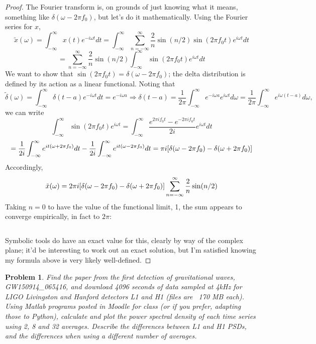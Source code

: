 \documentclass{article}
\newtheorem{plm}{Problem}
\begin{document}
\begin{proof}
  The Fourier transform is, on grounds of just knowing what it means, something like $\delta(\omega - 2\pi f_{0})$, but let's do it mathematically.
  Using the Fourier series for $x$,
  \[
    \tilde{x}(\omega) = \int_{-\infty}^{\infty}x(t)e^{-i\omega t}dt
    = \int_{-\infty}^{\infty}\sum_{n = -\infty}^{\infty}\frac{2}{n}\sin(n/2)\sin(2\pi f_{0} t)e^{i\omega t}dt
  \]
  \[
    = \sum_{n=-\infty}^{\infty}\frac{2}{n}\sin(n/2)\int_{-\infty}^{\infty}\sin(2\pi f_{0} t)e^{i \omega t}dt
  \]
  We want to show that $\sin(2\pi f_{0}t) = \delta(\omega - 2\pi f_{0})$; the delta distribution is defined by its action as a linear functional.
  Noting that
  \[
    \tilde{\delta}(\omega) = \int_{-\infty}^{\infty}\delta(t - a)e^{-i\omega t}dt = e^{-i\omega a}
    \Rightarrow \delta(t-a) = \frac{1}{2\pi}\int_{-\infty}^{\infty}e^{-i\omega a}e^{i\omega t}d\omega = \frac{1}{2\pi}\int_{-\infty}^{\infty}e^{i\omega (t-a)}d\omega,
  \]
  we can write
  \[
    \int_{-\infty}^{\infty}\sin(2\pi f_{0}t)e^{i\omega t} = \int_{-\infty}^{\infty}\frac{e^{2\pi if_{0}t}-e^{-2\pi if_{0}t}}{2i}e^{i\omega t}dt
  \]
  \[
    = \frac{1}{2i}\int_{-\infty}^{\infty}e^{it(\omega + 2\pi f_{0})}dt - \frac{1}{2i}\int_{-\infty}^{\infty}e^{it(\omega - 2\pi f_{0})}dt
    = \pi i\qty[\delta(\omega - 2\pi f_{0}) - \delta(\omega + 2\pi f_{0})]
  \]
  Accordingly,
  \[
    \tilde{x}(\omega) = 2\pi i\qty[\delta(\omega - 2\pi f_{0}) - \delta(\omega + 2\pi f_{0})]\sum_{n = -\infty}^{\infty}\frac{2}{n}\sin(n/2)
  \]
  Taking $n = 0$ to have the value of the functional limit, 1, the sum appears to converge empirically, in fact to $2\pi$:
  \inputminted{scheme}{sum.scm}
  Symbolic tools do have an exact value for this, clearly by way of the complex plane; it'd be interesting to work out an exact solution,
  but I'm satisfied knowing my formula above is very likely well-defined.
\end{proof}

\begin{plm}
  Find the paper from the first detection of gravitational waves, GW150914\_065416,
  and download 4096 seconds of data sampled at 4kHz for LIGO Livingston and Hanford detectors L1 and H1 (files are ~170 MB each).
  Using Matlab programs posted in Moodle for class (or if you prefer, adapting those to Python),
  calculate and plot the power spectral density of each time series using 2, 8 and 32 averages.
  Describe the differences between L1 and H1 PSDs, and the differences when using a different number of averages.
\end{plm}
\end{document}
